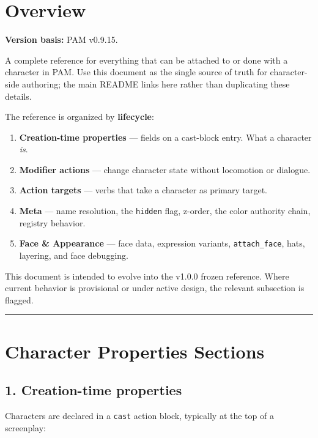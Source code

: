 \documentclass[
  11pt,
]{book}
\providecommand{\tightlist}{%
  \setlength{\itemsep}{0pt}\setlength{\parskip}{0pt}}
\begin{document}
\section{Overview}\label{overview-1}

\textbf{Version basis:} PAM v0.9.15.

A complete reference for everything that can be attached to or done with
a character in PAM. Use this document as the single source of truth for
character-side authoring; the main README links here rather than
duplicating these details.

The reference is organized by \textbf{lifecycle}:

\begin{enumerate}
\def\labelenumi{\arabic{enumi}.}
\tightlist
\item
  \textbf{Creation-time properties} --- fields on a cast-block entry.
  What a character \emph{is}.
\item
  \textbf{Modifier actions} --- change character state without
  locomotion or dialogue.
\item
  \textbf{Action targets} --- verbs that take a character as primary
  target.
\item
  \textbf{Meta} --- name resolution, the \texttt{hidden} flag, z-order,
  the color authority chain, registry behavior.
\item
  \textbf{Face \& Appearance} --- face data, expression variants,
  \texttt{attach\_face}, hats, layering, and face debugging.
\end{enumerate}

This document is intended to evolve into the v1.0.0 frozen reference.
Where current behavior is provisional or under active design, the
relevant subsection is flagged.

\begin{center}\rule{0.5\linewidth}{0.5pt}\end{center}

\section{Character Properties
Sections}\label{character-properties-sections}

\subsection{1. Creation-time properties}\label{creation-time-properties}

Characters are declared in a \texttt{cast} action block, typically at
the top of a screenplay:
\end{document}
